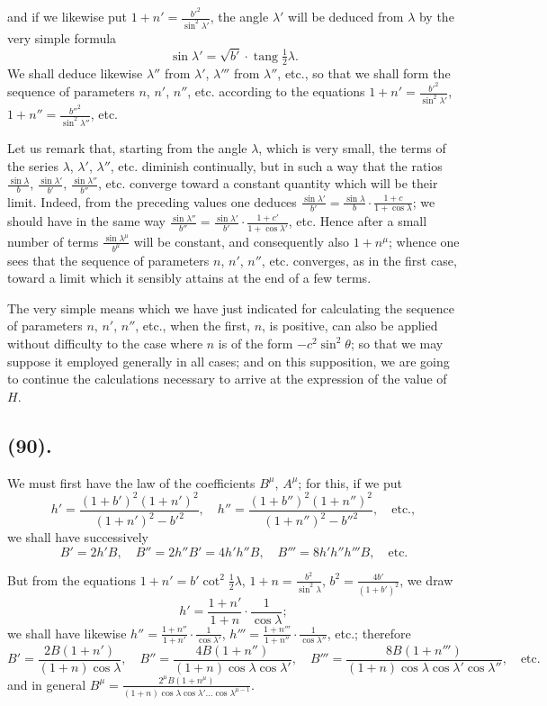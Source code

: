 \documentclass{article}
\begin{document}
and if we likewise put $1+n'=\frac{b'^{2}}{\sin^{2}\lambda'}$, the angle $\lambda'$ will be deduced from $\lambda$ by the very simple formula
\[ \sin\lambda'=\sqrt{b'}\cdot\operatorname{tang}\tfrac{1}{2}\lambda. \]
We shall deduce likewise $\lambda''$ from $\lambda'$, $\lambda'''$ from $\lambda''$, etc., so that we shall form the sequence of parameters $n$, $n'$, $n''$, etc. according to the equations $1+n'=\frac{b'^{2}}{\sin^{2}\lambda'}$, $1+n''=\frac{b''^{2}}{\sin^{2}\lambda''}$, etc.

Let us remark that, starting from the angle $\lambda$, which is very small, the terms of the series $\lambda$, $\lambda'$, $\lambda''$, etc. diminish continually, but in such a way that the ratios $\frac{\sin\lambda}{b}$, $\frac{\sin\lambda'}{b'}$, $\frac{\sin\lambda''}{b''}$, etc. converge toward a constant quantity which will be their limit. Indeed, from the preceding values one deduces $\frac{\sin\lambda'}{b'}=\frac{\sin\lambda}{b}\cdot\frac{1+c}{1+\cos\lambda}$; we should have in the same way $\frac{\sin\lambda''}{b''}=\frac{\sin\lambda'}{b'}\cdot\frac{1+c'}{1+\cos\lambda'}$, etc. Hence after a small number of terms $\frac{\sin\lambda^{\mu}}{b^{\mu}}$ will be constant, and consequently also $1+n^{\mu}$; whence one sees that the sequence of parameters $n$, $n'$, $n''$, etc. converges, as in the first case, toward a limit which it sensibly attains at the end of a few terms.

The very simple means which we have just indicated for calculating the sequence of parameters $n$, $n'$, $n''$, etc., when the first, $n$, is positive, can also be applied without difficulty to the case where $n$ is of the form $-c^{2}\sin^{2}\theta$; so that we may suppose it employed generally in all cases; and on this supposition, we are going to continue the calculations necessary to arrive at the expression of the value of $H$.

\subsection*{(90).}

We must first have the law of the coefficients $B^{\mu}$, $A^{\mu}$; for this, if we put
\[ h'=\frac{(1+b')^{2}(1+n')^{2}}{(1+n')^{2}-b'^{2}},\quad h''=\frac{(1+b'')^{2}(1+n'')^{2}}{(1+n'')^{2}-b''^{2}},\quad\text{etc.}, \]
we shall have successively
\[ B'=2h'B,\quad B''=2h''B'=4h'h''B,\quad B'''=8h'h''h'''B,\quad\text{etc.} \]

But from the equations $1+n'=b'\cot^{2}\frac{1}{2}\lambda$, $1+n=\frac{b^{2}}{\sin^{2}\lambda}$, $b^{2}=\frac{4b'}{(1+b')^{2}}$, we draw
\[ h'=\frac{1+n'}{1+n}\cdot\frac{1}{\cos\lambda}; \]
we shall have likewise $h''=\frac{1+n''}{1+n'}\cdot\frac{1}{\cos\lambda'}$, $h'''=\frac{1+n'''}{1+n''}\cdot\frac{1}{\cos\lambda''}$, etc.; therefore
\[ B'=\frac{2B(1+n')}{(1+n)\cos\lambda},\quad B''=\frac{4B(1+n'')}{(1+n)\cos\lambda\cos\lambda'},\quad B'''=\frac{8B(1+n''')}{(1+n)\cos\lambda\cos\lambda'\cos\lambda''},\quad\text{etc.} \]
and in general $B^{\mu}=\frac{2^{\mu}B(1+n^{\mu})}{(1+n)\cos\lambda\cos\lambda'\ldots\cos\lambda^{\mu-1}}$.
\end{document}
